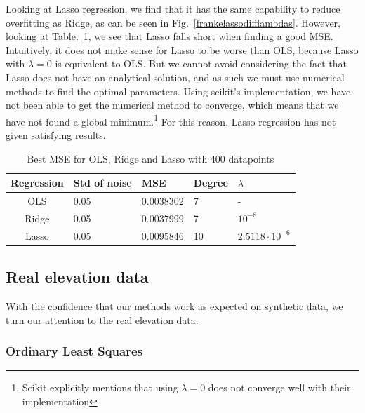 \documentclass[twocolumn,10pt,cleanfoot]{asme2ej}
\begin{document}
Looking at Lasso regression, we find that it has the same capability to reduce overfitting as Ridge, as can be seen in Fig.~\ref{frankelassodifflambdas}. However, looking at Table.~\ref{ols_vs_ridge_vs_lasso_table}, we see that Lasso falls short when finding a good MSE. Intuitively, it does not make sense for Lasso to be worse than OLS, because Lasso with $\lambda = 0$ is equivalent to OLS. But we cannot avoid considering the fact that Lasso does not have an analytical solution, and as such we must use numerical methods to find the optimal parameters. Using scikit's implementation, we have not been able to get the numerical method to converge, which means that we have not found a global minimum.\footnote{Scikit explicitly mentions that using $\lambda = 0$ does not converge well with their implementation} For this reason, Lasso regression has not given satisfying results.

\begin{table}[t]
\caption{Best MSE for OLS, Ridge and Lasso with 400 datapoints}
\begin{center}
\label{ols_vs_ridge_vs_lasso_table}
\begin{tabular}{c | l l l l}
Regression & Std of noise & MSE & Degree & $\lambda$ \\
\hline
OLS & 0.05 & 0.0038302 & 7 & - \\
Ridge & 0.05 & 0.0037999 & 7 & $10^{-8}$ \\
Lasso & 0.05 & 0.0095846 & 10 & $2.5118 \cdot 10^{-6}$ \\
\hline
\end{tabular}
\end{center}
\end{table}


\subsection{Real elevation data}

With the confidence that our methods work as expected on synthetic data, we turn our attention to the real elevation data. 

\subsubsection{Ordinary Least Squares}
\end{document}
